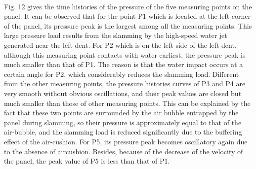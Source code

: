 \documentclass[UTF8]{ctexart}
\begin{document}
\paragraph{\quad}Fig. 12 gives the time histories of the pressure of the five measuring 
                points on the panel. It can be observed that for the point P1 which is 
                located at the left corner of the panel, its pressure peak is the largest 
                among all the measuring points. This large pressure load results from the 
                slamming by the high-speed water jet generated near the left dent. 
                For P2 which is on the left side of the left dent, although this measuring 
                point contacts with water earliest, the pressure peak is much smaller than 
                that of P1. The reason is that the water impact occurs at a certain angle 
                for P2, which considerably reduces the slamming load. Different from the 
                other measuring points, the pressure histories curves of P3 and P4 are very 
                smooth without obvious oscillations, and their peak values are closed but 
                much smaller than those of other measuring points. This can be explained by 
                the fact that these two points are surrounded by the air bubble entrapped by 
                the panel during slamming, so their pressure is approximately equal to that of 
                the air-bubble, and the slamming load is reduced significantly due to the buffering 
                effect of the air-cushion. For P5, its pressure peak becomes oscillatory again due 
                to the absence of aircushion. Besides, because of the decrease of the velocity 
                of the panel, the peak value of P5 is less than that of P1.
\end{document}
